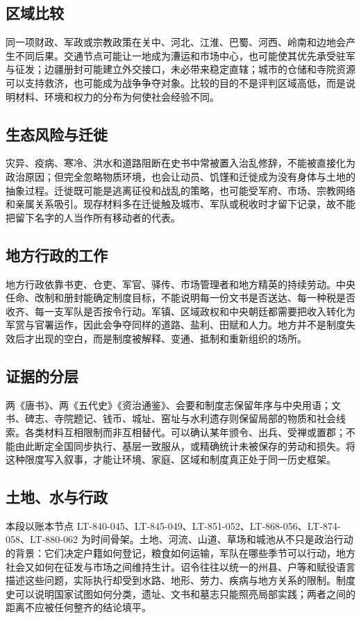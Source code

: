\subsection{区域比较}
同一项财政、军政或宗教政策在关中、河北、江淮、巴蜀、河西、岭南和边地会产生不同后果。交通节点可能让一地成为漕运和市场中心，也可能使其优先承受驻军与征发；边疆册封可能建立外交接口，未必带来稳定直辖；城市的仓储和寺院资源可以支持救济，也可能成为战争争夺对象。比较的目的不是评判区域高低，而是说明材料、环境和权力的分布为何使社会经验不同。

\subsection{生态风险与迁徙}
灾异、疫病、寒冷、洪水和道路阻断在史书中常被置入治乱修辞，不能被直接化为政治原因；但完全忽略物质环境，也会让动员、饥馑和迁徙成为没有身体与土地的抽象过程。迁徙既可能是逃离征役和战乱的策略，也可能受军府、市场、宗教网络和亲属关系吸引。现存材料多在迁徙触及城市、军队或税收时才留下记录，故不能把留下名字的人当作所有移动者的代表。

\subsection{地方行政的工作}
地方行政依靠书吏、仓吏、军官、驿传、市场管理者和地方精英的持续劳动。中央任命、改制和册封能确定制度目标，不能说明每一份文书是否送达、每一种税是否收齐、每一支军队是否按令行动。军镇、区域政权和中央朝廷都需要把收入转化为军赏与官署运作，因此会争夺同样的道路、盐利、田赋和人力。地方并不是制度失效后才出现的空白，而是制度被解释、变通、抵制和重新组织的场所。

\subsection{证据的分层}
两《唐书》、两《五代史》《资治通鉴》、会要和制度志保留年序与中央用语；文书、碑志、寺院题记、钱币、城址、窑址与水利遗存则保留局部的物质和社会线索。各类材料互相限制而非互相替代。可以确认某年颁令、出兵、受禅或置郡；不能由此断定全国同步执行、基层一致服从，或精确统计未被保存的劳动和损失。将这种限度写入叙事，才能让环境、家庭、区域和制度真正处于同一历史框架。
\subsection{土地、水与行政}
本段以账本节点 LT-840-045、LT-845-049、LT-851-052、LT-868-056、LT-874-058、LT-880-062 为时间骨架。土地、河流、山道、草场和城池从不只是政治行动的背景：它们决定户籍如何登记，粮食如何运输，军队在哪些季节可以行动，地方社会又如何在征发与市场之间维持生计。诏令往往以统一的州县、户等和赋役语言描述这些问题，实际执行却受到水路、地形、劳力、疾病与地方关系的限制。制度史可以说明国家试图如何分类，遗址、文书和墓志只能照亮局部实践；两者之间的距离不应被任何整齐的结论填平。


